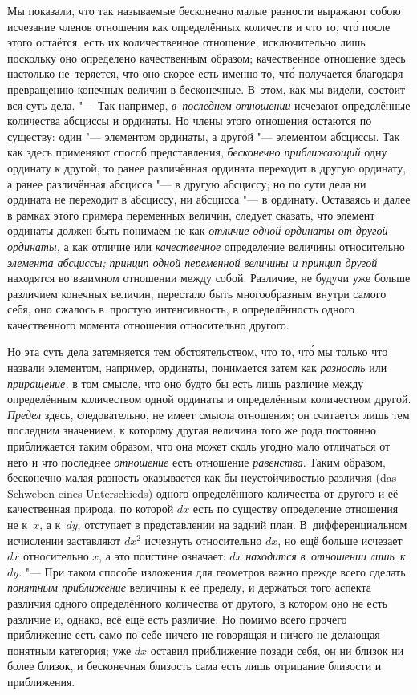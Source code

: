 Мы показали, что так называемые бесконечно малые разности выражают собою
исчезание членов отношения как определённых количеств и что то, чт\'{о} после этого
остаётся, есть их количественное отношение, исключительно лишь поскольку оно
определено качественным образом; качественное отношение здесь настолько
не~теряется, что оно скорее есть именно то, чт\'{о} получается благодаря
превращению конечных величин в бесконечные. В~этом, как мы видели, состоит вся
суть дела. "--- Так например, {\em в~последнем отношении} исчезают определённые
количества абсциссы и ординаты. Но члены этого отношения остаются по существу:
один "--- элементом ординаты, а другой "--- элементом абсциссы. Так как здесь
применяют способ представления, {\em бесконечно приближающий} одну ординату
к другой, то ранее различённая ордината переходит в другую ординату, а ранее
различённая абсцисса "--- в другую абсциссу; но по сути дела ни ордината
не переходит в абсциссу, ни абсцисса "--- в ординату. Оставаясь
и далее в рамках этого примера переменных
величин, следует сказать, что элемент ординаты должен быть понимаем не как
{\em отличие одной ординаты от другой ординаты,} а как отличие или
{\em качественное} определение величины относительно {\em элемента абсциссы;}
{\em принцип одной переменной величины и принцип другой} находятся во взаимном
отношении между собой. Различие, не будучи уже больше различием конечных
величин, перестало быть многообразным внутри самого себя, оно сжалось в~простую
интенсивность, в определённость одного качественного момента отношения
относительно другого.

Но эта суть дела затемняется тем обстоятельством, что то, чт\'{о} мы только что
назвали элементом, например, ординаты, понимается затем как {\em разность} или
{\em приращение,} в том смысле, что оно будто бы есть лишь различие между
определённым количеством одной ординаты и определённым количеством другой.
{\em Предел} здесь, следовательно, не имеет смысла отношения; он считается лишь
тем последним значением, к которому другая величина того же рода постоянно
приближается таким образом, что она может сколь угодно мало отличаться от него
и что последнее {\em отношение} есть отношение {\em равенства}. Таким образом,
бесконечно малая разность оказывается как бы неустойчивостью различия (das
Schweben eines Unter\-schieds) одного определённого количества от другого и её
качественная природа, по которой $dx$ есть по существу определение отношения не
к~$x$, а к~$dy$, отступает в представлении на задний план. В~дифференциальном
исчислении заставляют $dx^2$ исчезнуть относительно $dx$, но ещё больше
исчезает $dx$ относительно $x$, а это поистине означает: $dx$
{\em находится в~отношении лишь~к}~$dy$. "--- При таком способе изложения для
геометров важно прежде всего сделать {\em понятным приближение}
величины к её пределу, и держаться того аспекта различия одного
определённого количества от другого, в котором оно не есть различие и, однако,
всё ещё есть различие. Но помимо всего прочего приближение есть само по себе
ничего не говорящая и ничего не делающая понятным категория; уже $dx$ оставил
приближение позади себя, он ни близок ни более близок, и бесконечная близость
сама есть лишь отрицание близости и приближения.


